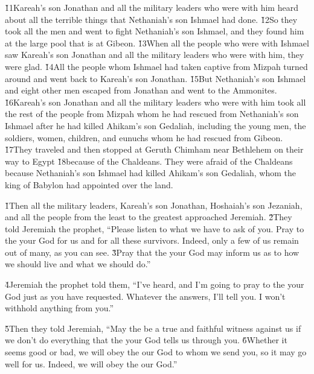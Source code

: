 \v{11}Kareah's son Jonathan and all the military leaders who were with him heard about all the terrible things that Nethaniah's son Ishmael had done. \v{12}So they took all the men and went to fight Nethaniah's son Ishmael, and they found him at the large pool that is at Gibeon. \v{13}When all the people who were with Ishmael saw Kareah's son Jonathan and all the military leaders who were with him, they were glad. \v{14}All the people whom Ishmael had taken captive from Mizpah turned around and went back to Kareah's son Jonathan. \v{15}But Nethaniah's son Ishmael and eight other men escaped from Jonathan and went to the Ammonites. \v{16}Kareah's son Jonathan and all the military leaders who were with him took all the rest of the people from Mizpah whom he had rescued from Nethaniah's son Ishmael after he had killed Ahikam's son Gedaliah, including the young men, the soldiers, women, children, and eunuchs whom he had rescued from Gibeon. \v{17}They traveled and then stopped at Geruth Chimham near Bethlehem on their way to Egypt \v{18}because of the Chaldeans. They were afraid of the Chaldeans because Nethaniah's son Ishmael had killed Ahikam's son Gedaliah, whom the king of Babylon had appointed over the land.

\v{1}Then all the military leaders, Kareah's son Jonathan, Hoshaiah's son Jezaniah, and all the people from the least to the greatest approached Jeremiah. \v{2}They told Jeremiah the prophet, ``Please listen to what we have to ask of you. Pray to the  your God for us and for all these survivors. Indeed, only a few of us remain out of many, as you can see. \v{3}Pray that the  your God may inform us as to how we should live and what we should do.''

\v{4}Jeremiah the prophet told them, ``I've heard, and I'm going to pray to the  your God just as you have requested. Whatever the  answers, I'll tell you. I won't withhold anything from you.''

\v{5}Then they told Jeremiah, ``May the  be a true and faithful witness against us if we don't do everything that the  your God tells us through you. \v{6}Whether it seems good or bad, we will obey the  our God to whom we send you, so it may go well for us. Indeed, we will obey the  our God.''

